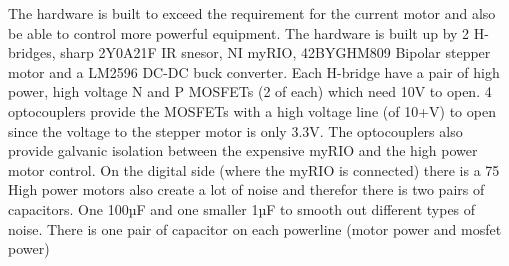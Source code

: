 The hardware is built to exceed the requirement for the current motor and also be able to control more powerful equipment. \newline
The hardware is built up by 2 H-bridges, sharp 2Y0A21F IR snesor, NI myRIO, 42BYGHM809 Bipolar stepper motor and a LM2596 DC-DC buck converter. 
Each H-bridge have a pair of high power, high voltage N and P MOSFETs (2 of each) which need 10V to open. 4 optocouplers provide the MOSFETs with a high voltage line (of 10+V) to open since the voltage to the stepper motor is only 3.3V. The optocouplers also provide galvanic isolation between the expensive myRIO and the high power motor control. On the digital side (where the myRIO is connected) there is a 75
High power motors also create a lot of noise and therefor there is two pairs of capacitors. One 100µF and one smaller 1µF to smooth out different types of noise. There is one pair of capacitor on each powerline (motor power and mosfet power)